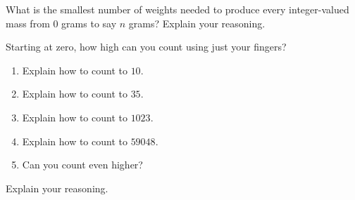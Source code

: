 \documentclass[nooutcomes]{ximera}
\begin{document}
\begin{problem}What is the smallest number of weights needed to produce every
  integer-valued mass from $0$ grams to say $n$ grams? Explain your
  reasoning.
\end{problem} 

\begin{problem}Starting at zero, how high can you count using just your
  fingers?
\begin{enumerate}
\item Explain how to count to $10$.
\item Explain how to count to $35$.
\item Explain how to count to $1023$.
\item Explain how to count to $59048$.
\item Can you count even higher?
\end{enumerate}
Explain your reasoning.

\end{problem}
\end{document}
